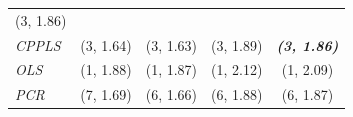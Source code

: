 \documentclass[12pt,A4paper,authoryear]{elsarticle} %
\theoremstyle{definition}
\theoremstyle{definition}
\theoremstyle{remark}
\begin{document}
\begin{longtable}[]{@{}lcccc@{}}
\begin{minipage}[t]{0.19\columnwidth}
(3, 1.86)\strut
\end{minipage}\tabularnewline
\begin{minipage}[t]{0.10\columnwidth}\raggedright\strut
\emph{CPPLS}\strut
\end{minipage} & \begin{minipage}[t]{0.19\columnwidth}\centering\strut
(3, 1.64)\strut
\end{minipage} & \begin{minipage}[t]{0.19\columnwidth}\centering\strut
(3, 1.63)\strut
\end{minipage} & \begin{minipage}[t]{0.19\columnwidth}\centering\strut
(3, 1.89)\strut
\end{minipage} & \begin{minipage}[t]{0.19\columnwidth}\centering\strut
\textbf{\emph{(3, 1.86)}}\strut
\end{minipage}\tabularnewline
\begin{minipage}[t]{0.10\columnwidth}\raggedright\strut
\emph{OLS}\strut
\end{minipage} & \begin{minipage}[t]{0.19\columnwidth}\centering\strut
(1, 1.88)\strut
\end{minipage} & \begin{minipage}[t]{0.19\columnwidth}\centering\strut
(1, 1.87)\strut
\end{minipage} & \begin{minipage}[t]{0.19\columnwidth}\centering\strut
(1, 2.12)\strut
\end{minipage} & \begin{minipage}[t]{0.19\columnwidth}\centering\strut
(1, 2.09)\strut
\end{minipage}\tabularnewline
\begin{minipage}[t]{0.10\columnwidth}\raggedright\strut
\emph{PCR}\strut
\end{minipage} & \begin{minipage}[t]{0.19\columnwidth}\centering\strut
(7, 1.69)\strut
\end{minipage} & \begin{minipage}[t]{0.19\columnwidth}\centering\strut
(6, 1.66)\strut
\end{minipage} & \begin{minipage}[t]{0.19\columnwidth}\centering\strut
(6, 1.88)\strut
\end{minipage} & \begin{minipage}[t]{0.19\columnwidth}\centering\strut
(6, 1.87)\strut
\end{minipage}\tabularnewline

\end{longtable}
\end{document}
